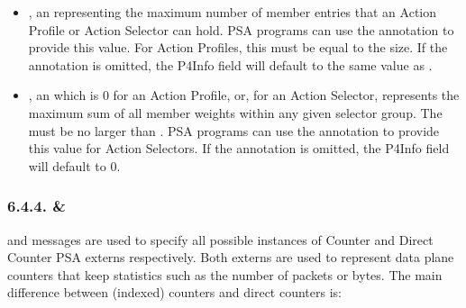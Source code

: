 \documentclass[11pt]{article}
\begin{document}
{\begin{itemize}
\item{}
, an  representing the maximum number of member
entries that an Action Profile or Action Selector can hold. PSA programs can
use the  annotation to provide this value.  For Action
Profiles, this must be equal to the size. If the annotation is omitted, the
P4Info field will default to the same value as .%

\item{}
, an  which is 0 for an Action Profile, or, for an
Action Selector, represents the maximum sum of all member weights within any
given selector group. The  must be no larger than . PSA
programs can use the  annotation to provide this value for
Action Selectors. If the annotation is omitted, the P4Info field will default
to 0.%
\end{itemize}%

\subsubsection{6.4.4.\hspace*{0.5em} \& }\label{sec-counter-directcounter}%

\noindent{} and  messages are used to specify all possible
instances of Counter and Direct Counter PSA externs respectively. Both externs
are used to represent data plane counters that keep statistics such as the
number of packets or bytes. The main difference between (indexed) counters and
direct counters is:%

}
\end{document}
